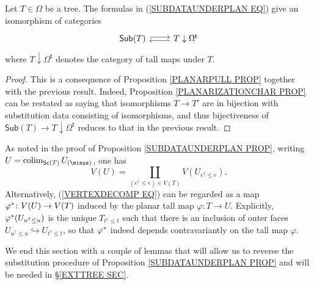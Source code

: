 \documentclass[a4paper,10pt]{article}%
\begin{document}
\begin{corollary}\label{SUBDATAUNDERPLAN COR}
Let $T \in \Omega$ be a tree. The formulas in (\ref{SUBDATAUNDERPLAN EQ}) give an isomorphism of categories
\begin{equation}\label{SUBDATAUNDERNONPL EQ}
\begin{tikzcd}[row sep =0pt]
	\mathsf{Sub}(T) \ar[r,shift left=2pt] &
	T \downarrow \Omega^{\mathsf{t}} \ar[l,shift left=2pt]
\end{tikzcd}
\end{equation}
where $T \downarrow \Omega^{\mathsf{t}}$ denotes
the category of tall maps under $T$.
\end{corollary}


\begin{proof}
	This is a consequence of Proposition \ref{PLANARPULL PROP} together with the previous result.
	Indeed, Proposition \ref{PLANARIZATIONCHAR PROP} can be restated as saying that isomorphisms $T \to T'$ are in bijection with substitution data consisting of isomorphisms, and thus  bijectiveness of $\mathsf{Sub}(T) \to T \downarrow \Omega^{\mathsf{t}}$ reduces to that in the previous result.
\end{proof}


\begin{remark}\label{VERTEXDECOMP REM}
As noted in the proof of Proposition \ref{SUBDATAUNDERPLAN PROP}, writing $U = \colim_{\mathsf{Sc}(T)}U_{(\minus)}$,
	one has 
\begin{equation}\label{VERTEXDECOMP EQ}
	V(U) = \coprod_{(e^{\uparrow} \leq e) \in V(T)}
	V(U_{e^{\uparrow} \leq e}).
\end{equation}
Alternatively, (\ref{VERTEXDECOMP EQ}) can be regarded as a map 
$\varphi^{\**} \colon V(U) \to V(T)$ induced by the planar tall map 
$\varphi \colon T \to U$.
Explicitly, $\varphi^{\**}(U_{u^{\uparrow} \leq u})$ 
is the unique $T_{t^{\uparrow}\leq t}$ such that
there is an inclusion of outer faces $U_{u^{\uparrow} \leq u} \hookrightarrow U_{t^{\uparrow} \leq t}$,
so that $\varphi^{\**}$ indeed depends contravariantly on the tall map $\varphi$.
\end{remark}


We end this section with a couple of lemmas that will allow us to reverse the substitution procedure of 
Proposition \ref{SUBDATAUNDERPLAN PROP}
and will be needed in \S \ref{EXTTREE SEC}.
\end{document}
